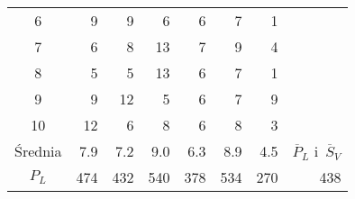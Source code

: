 \begin{table}[H]
{\begin{tabular}{|c|r|r|r|r|r|r|l}
    6     & 9                              & 9                                                    & 6                                                    & 6                                                    & 7                                                     & 1                                                     &                                       \\ \cline{1-7}
    7     & 6                              & 8                                                    & 13                                                   & 7                                                    & 9                                                     & 4                                                     &                                       \\ \cline{1-7}
    8     & 5                              & 5                                                    & 13                                                   & 6                                                    & 7                                                     & 1                                                     &                                       \\ \cline{1-7}
    9     & 9                              & 12                                                   & 5                                                    & 6                                                    & 7                                                     & 9                                                     &                                       \\ \cline{1-7}
    10    & 12                             & 6                                                    & 8                                                    & 6                                                    & 8                                                     & 3                                                     & \multicolumn{1}{r}{}                  \\ \hline
    Średnia  & 7.9                             & 7.2                                                   & 9.0                                                   & 6.3                                                   & 8.9                                                    & 4.5                                                    & \multicolumn{1}{c|}{$\overline{P}_L$ i~$\overline{S}_V$} \\ \hline
    $P_L$ & 474                           & 432                                                 & 540                                                  & 378                                                 & 534                                                  & 270                                                   & \multicolumn{1}{r|}{438}             \\ \hline

\end{tabular}}
\end{table}
